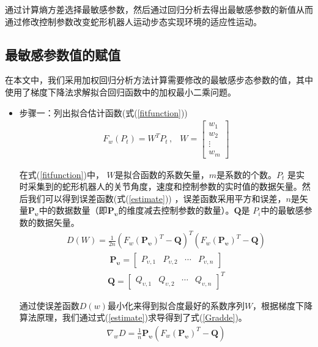 通过计算熵方差选择最敏感参数，然后通过回归分析去得出最敏感参数的新值从而通过修改控制参数改变蛇形机器人运动步态实现环境的适应性运动。

\subsection{最敏感参数值的赋值}
在本文中，我们采用加权回归分析方法计算需要修改的最敏感步态参数的值，其中使用了梯度下降法求解拟合回归函数中的加权最小二乘问题。

\begin{itemize}
	\item 步骤一：列出拟合估计函数(式(\ref{fitfunction}))
	\begin{eqnarray}\label{fitfunction}
	F_{w}(P_{t})=W^{T}P_{t}\,,&W=\begin{bmatrix}w_{1}\\ w_{2}\\ \vdots \\ w_{m}\end{bmatrix}
	\end{eqnarray}
	
	在式(\ref{fitfunction})中， $W$是拟合函数的系数矢量，$m$是系数的个数。$P_{t}$ 是实时采集到的蛇形机器人的关节角度，速度和控制参数的实时值的数据矢量。然后我们可以得到误差函数(式(\ref{estimate})) ，误差函数采用平方和误差，$n$是矢量$\bm{P_{\upsilon}}$中的数据数量（即$\bm{P_{\upsilon}}$的维度减去控制参数的数量）。$\bm{Q}$是 $P_{i}$中的最敏感参数的数据矢量。
	\begin{eqnarray}\label{estimate}
	D(W)=\frac{1}{2n}(F_{w}(\bm{P_{\upsilon}})^{T}-\bm{Q})^{T}(F_{w}(\bm{P_{\upsilon}})^{T}-\bm{Q})
	\end{eqnarray}
	\begin{eqnarray}
	\bm{P_{\upsilon}}=\begin{bmatrix}P_{\upsilon,1}&P_{\upsilon,2}  &\cdots  &P_{\upsilon,n} \end{bmatrix}
	\end{eqnarray}
	\begin{eqnarray}
	\bm{Q}=\begin{bmatrix}Q_{\upsilon,1}& Q_{\upsilon,2}& \cdots & Q_{\upsilon,n}\end{bmatrix}^{T}
	\end{eqnarray}
	
	通过使误差函数$D(w)$最小化来得到拟合度最好的系数序列$W$，根据梯度下降算法原理，我们通过式(\ref{estimate})求导得到了式(\ref{Gradde})。
	\begin{eqnarray}\label{Gradde}
	\nabla_{w}D=\frac{1}{n}\bm{P_{\upsilon}}(F_{w}(\bm{P_{\upsilon}})^{T}-\bm{Q})
	\end{eqnarray}
	

\end{itemize}
